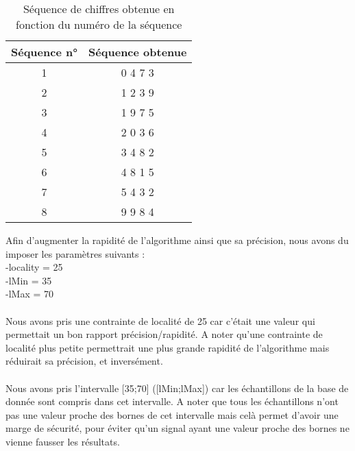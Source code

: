 \documentclass[a4paper,11pt]{article}
\begin{document}
\label{tableau}

\begin{center}


\begin{table}[H]

\begin{tabular}{|c|c|}

\hline
Séquence n° & Séquence obtenue \\
\hline
1 & 0 4 7 3 \\
\hline
2 & 1 2 3 9 \\
\hline
3 & 1 9 7 5 \\
\hline
4 & 2 0 3 6 \\
\hline
5 & 3 4 8 2 \\
\hline
6 & 4 8 1 5 \\
\hline
7 & 5 4 3 2 \\
\hline
8 & 9 9 8 4 \\
\hline


\end{tabular}
\caption{Séquence de chiffres obtenue en fonction du numéro de la séquence}
 
\end{table}
\end{center}
Afin d'augmenter la rapidité de l'algorithme ainsi que sa précision, nous avons du imposer les paramètres suivants :
\\
-locality = 25
\\
-lMin = 35
\\
-lMax = 70
\\
\\
Nous avons pris une contrainte de localité de 25 car c'était une valeur qui permettait un bon rapport précision/rapidité.
A noter qu'une contrainte de localité plus petite permettrait une plus grande rapidité de l'algorithme mais réduirait sa précision, et inversément.
\\
\\
Nous avons pris l'intervalle [35;70] ([lMin;lMax]) car les échantillons de la base de donnée sont compris dans cet intervalle.
A noter que tous les échantillons n'ont pas une valeur proche des bornes de cet intervalle mais celà permet d'avoir une marge de sécurité, pour éviter qu'un signal ayant une valeur proche des bornes ne vienne fausser les résultats.
\end{document}
